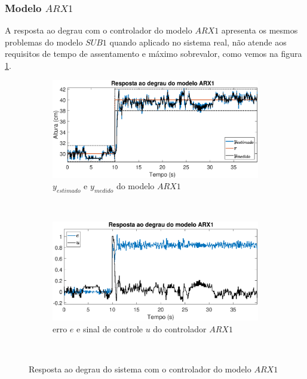 \subsubsection{Modelo $ARX1$}
A resposta ao degrau com o controlador do modelo $ARX1$ apresenta os mesmos problemas do modelo $SUB1$ quando aplicado no sistema real, não atende aos requisitos de tempo de assentamento e máximo sobrevalor, como vemos na figura \ref{fig:steprarx1y}.
\begin{figure}[htb]
	\centering
	\begin{subfigure}[t]{0.48\textwidth}
		\includegraphics[width=1\linewidth]{steprarx1y}
		\caption[$y_{estimado}$ e $y_{medido}$ do modelo $ARX1$]{$y_{estimado}$ e $y_{medido}$ do modelo $ARX1$}
		\label{fig:steprarx1y}
	\end{subfigure}
	~ %
	\begin{subfigure}[t]{0.48\textwidth}
		\includegraphics[width=1\linewidth]{steprarx1e}
		\caption[erro $e$ e sinal de controle $u$ do controlador $ARX1$]{erro $e$ e sinal de controle $u$ do controlador $ARX1$}
		\label{fig:steprarx1e}
	\end{subfigure}
	~ %
	
	\caption{Resposta ao degrau do sistema com o controlador do modelo $ARX1$}\label{fig:steprarx1}
\end{figure}

